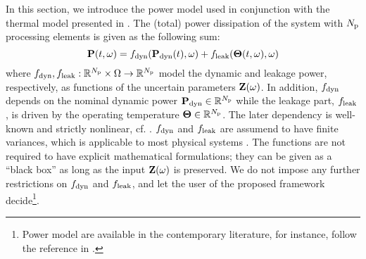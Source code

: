 In this section, we introduce the power model used in conjunction with the thermal model presented in . The (total) power dissipation of the system with ${N_\text{p}}$ processing elements is given as the following sum:
\begin{equation} \elabel{power-model}
  \vP(\t, \o) = f_\dyn(\vP_\dyn(\t), \o) + f_\leak(\vTO(\t, \o), \o)
\end{equation}
where $f_{\text{dyn}}, f_{\text{leak}}: \mathbb{R}^{N_\text{p}} \times \Omega \to \mathbb{R}^{N_\text{p}}$ model the dynamic and leakage power, respectively, as functions of the uncertain parameters $\mathbf{Z}(\omega)$. In addition, $f_{\text{dyn}}$ depends on the nominal dynamic power $\mathbf{P}_{\text{dyn}} \in \mathbb{R}^{N_\text{p}}$ while the leakage part, $f_{\text{leak}}$, is driven by the operating temperature ${\boldsymbol\Theta} \in \mathbb{R}^{N_\text{p}}$. The later dependency is well-known and strictly nonlinear, cf. \cite{srivastava2010, liu2007}. $f_{\text{dyn}}$ and $f_{\text{leak}}$ are assumend to have finite variances, which is applicable to most physical systems \cite{xiu2002}. The functions are not required to have explicit mathematical formulations; they can be given as a ``black box'' as long as the input $\mathbf{Z}(\omega)$ is preserved. We do not impose any further restrictions on $f_{\text{dyn}}$ and $f_{\text{leak}}$, and let the user of the proposed framework decide\footnote{Power model are available in the contemporary literature, for instance, follow the reference in \cite{srivastava2010}.}.
